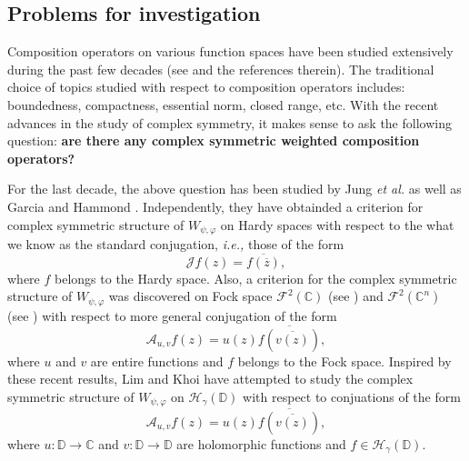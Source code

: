 \documentclass[12pt, reqno]{amsart}
\theoremstyle{definition}
\theoremstyle{remark}
\numberwithin{equation}{section}
\begin{document}
\subsection{Problems for investigation}
  Composition operators on various function spaces have been studied extensively during the past few decades (see \cite{Cowen_MacCluer_1995,Shapiro_1993} and the references therein). The traditional choice of topics studied with respect to composition operators includes: boundedness, compactness, essential norm, closed range, etc. With the recent advances in the study of complex symmetry, it makes sense to ask the following question: {\bf are there any complex symmetric weighted composition operators?}\\
\par 
For the last decade, the above question has been studied by Jung {\it et al.} \cite{Jung_Kim_Ko_Lee_JFAA_2014} as well as  Garcia and Hammond \cite{Garcia_Hammond}. Independently, they have obtainded a criterion for complex symmetric structure of $W_{\psi, \varphi}$ on Hardy spaces with respect to the what we know as the standard conjugation, {\it i.e.,} those of the form $$ \mathcal{J}f(z)=\overline{f(\overline{z})},$$
where $f$ belongs to the Hardy space. Also, a criterion for the complex symmetric structure of $W_{\psi, \varphi}$ was discovered on Fock space $\mathcal{F}^2(\mathbb{C})$ (see \cite{Hai_Khoi_JMAA_2016}) and $\mathcal{F}^2(\mathbb{C}^n)$ (see \cite{Hai_Khoi_CVE_2018}) with respect to more general conjugation of the form 
$$\mathcal{A}_{u, v}f(z)=u(z)\overline{f(\overline{v(z)})},$$
where $u$ and $v$ are entire functions and $f$ belongs to the Fock space. Inspired by these recent results, Lim and Khoi \cite{Lim_Khoi_JMAA_2018} have attempted to study the complex symmetric structure of $W_{\psi, \varphi}$ on $\mathcal{H}_\gamma(\mathbb{D})$ with respect to conjuations of the form 
$$\mathcal{A}_{u, v}f(z)=u(z)\overline{f(\overline{v(z)})},$$
where $u: \mathbb{D}\longrightarrow \mathbb{C}$ and $v: \mathbb{D}\longrightarrow \mathbb{D}$ are holomorphic functions and $f\in \mathcal{H}_\gamma(\mathbb{D})$.\\
\end{document}
